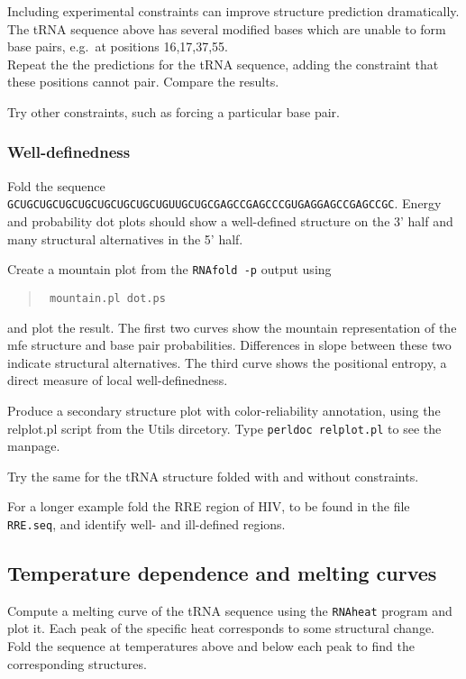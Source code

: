 \documentclass{article}
\begin{document}
Including experimental constraints can improve structure prediction
dramatically. The tRNA sequence above has several modified bases which are
unable to form base pairs, e.g.\ at positions 16,17,37,55.\\
Repeat the the predictions for the tRNA sequence, adding the constraint
that these positions cannot pair. Compare the results.

Try other constraints, such as forcing a particular base pair.


\subsubsection{Well-definedness}

Fold the sequence\\
{\small\tt GCUGCUGCUGCUGCUGCUGCUGCUGUUGCUGCGAGCCGAGCCCGUGAGGAGCCGAGCCGC}.
Energy and probability dot plots should show a well-defined structure on
the 3' half and many structural alternatives in the 5' half.

Create a mountain plot from the {\tt RNAfold -p} output using
\begin{quote}\tt
mountain.pl dot.ps
\end{quote} and plot the result. The first two curves show the
mountain representation of the mfe structure and base pair probabilities.
Differences in slope between these two indicate structural alternatives.
The third curve shows the positional entropy, a direct measure of local
well-definedness. 

Produce a secondary structure plot with color-reliability annotation, using
the relplot.pl script from the Utils dircetory. Type \texttt{perldoc
  relplot.pl} to see the manpage.

Try the same for the tRNA structure folded with and without constraints.

For a longer example fold the RRE region of HIV, to be found in the file
{\tt RRE.seq}, and identify well- and ill-defined regions.

\subsection{Temperature dependence and melting curves}

Compute a melting curve of the tRNA sequence using the {\tt RNAheat}
program and plot it. Each peak of the specific heat corresponds to some
structural change. Fold the sequence at temperatures above and below each
peak to find the corresponding structures.
\end{document}
